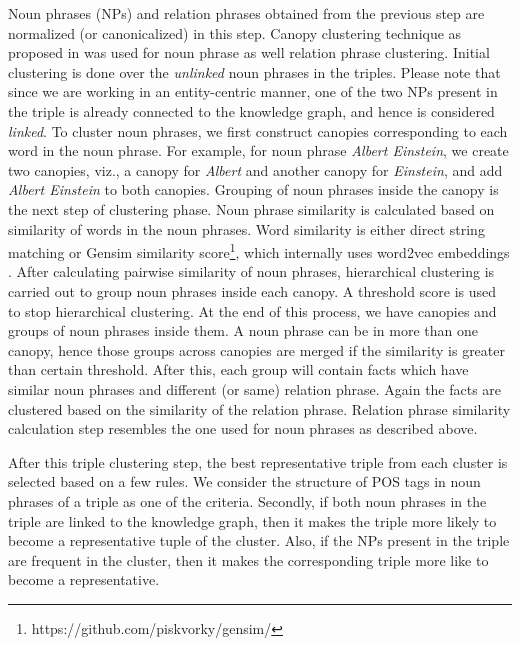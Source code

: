 Noun phrases (NPs) and relation phrases obtained from the previous step are normalized (or canonicalized) in this step. Canopy clustering technique as proposed in \cite{canopy} was 
used for noun phrase as well relation phrase clustering. 
Initial clustering is done over the \textit{unlinked} noun phrases in the triples. Please note that since we are working in an entity-centric manner, one of the two NPs present in the triple is already connected to the knowledge graph, and hence is considered \textit{linked}. 
To cluster noun phrases, we first construct canopies corresponding to each word in the noun phrase. For example, 
for noun phrase \textit{Albert Einstein}, we create two canopies, viz., a canopy for  \textit{Albert} and another canopy for  \textit{Einstein}, and add \textit{Albert Einstein} to both canopies. 
Grouping of noun phrases inside the canopy is the next step of clustering phase.
Noun phrase similarity is calculated based on  similarity of words in the noun phrases. 
Word similarity is either direct string matching or Gensim similarity score\footnote{https://github.com/piskvorky/gensim/}, which internally uses word2vec
embeddings \cite{mikolov2013distributed}. After calculating pairwise similarity of noun phrases, hierarchical clustering is carried out to group noun phrases inside each canopy. 
A threshold score is used to stop hierarchical clustering. At the end of this process, we have canopies and groups of noun phrases inside them. 
A noun phrase can be in more than one canopy, hence those groups across canopies are merged if the similarity is greater than certain threshold. After this, each group will contain facts which have similar noun phrases and different (or same) relation phrase.
Again the facts are clustered based on the similarity of the relation phrase. Relation phrase similarity calculation step resembles the one used for noun phrases as described above.

After this triple clustering step, the best representative triple from each cluster is selected based on a few rules. We consider the structure of POS tags in noun phrases of a triple as one of the criteria. Secondly, if both noun phrases in the triple are linked to the knowledge graph, then it makes the triple more likely to become a representative tuple of the cluster. Also, if the NPs present in the triple are frequent in the cluster, then it makes the corresponding triple more like to become a representative.


